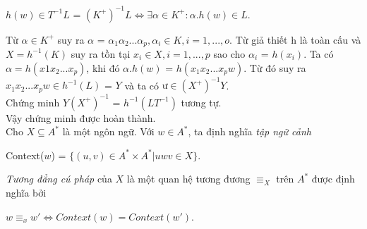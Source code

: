 $h(w) \in T^{-1}L$ = $(K^+)^{-1}L \Leftrightarrow \exists \alpha \in K^+ : \alpha.h(w) \in L$. 
\begin{flushleft}
Từ $\alpha \in K^+$ suy ra $\alpha$ = $\alpha_1\alpha_2...\alpha_p, \alpha_i \in K, i = 1,...,o$. Từ giả thiết h là toàn cấu và $X = h^{-1}(K)$ suy ra tồn tại $x_i \in X, i = 1,...,p$ sao cho $\alpha_i$ = $h(x_i)$. Ta có $\alpha = h(x1x_2...x_p)$, khi đó $\alpha.h(w)$ = $h(x_1x_2...x_pw)$. Từ đó suy ra $x_1x_2...x_pw \in h^{-1}(L)$ = $Y$ và ta có $ư \in (X^+)^{-1}Y$. \\
\hspace{10mm}Chứng minh $Y(X^+)^{-1}$ = $h^{-1}(LT^{-1})$ tương tự.\\
Vậy chứng minh được hoàn thành.\\
\hspace{10mm}Cho $X \subseteq A^*$ là một ngôn ngữ. Với $w \in A^*$, ta định nghĩa \textit{tập ngữ cảnh}
\end{flushleft}
Context($w$) = $\{ (u,v) \in A^* \times A^* | uwv \in X \}$.
\begin{flushleft}
\hspace{10mm}\textit{Tương đẳng cú pháp} của $X$ là một quan hệ tương đương $\equiv_X$ trên $A^*$ được định nghĩa bởi 
\end{flushleft}
$w \equiv_x w' \Leftrightarrow Context(w) = Context(w')$.
